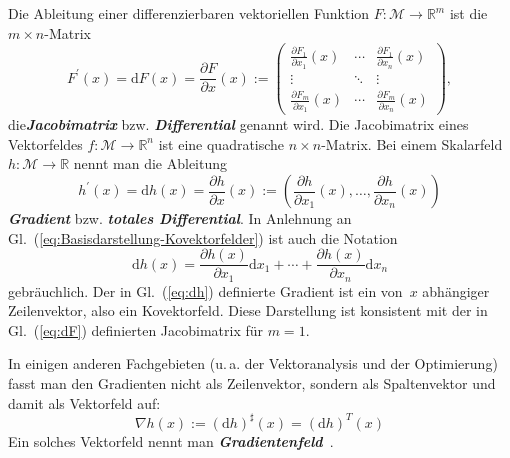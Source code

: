 Die Ableitung einer differenzierbaren vektoriellen
Funktion $F:\mathcal{M}\to{\mathbb{R}}^{m}$ ist die $m\times n$-Matrix
\begin{equation}
F^{\prime}(x)={\mathrm{d}} F(x)=\frac{\partial F}{\partial x}(x):=\left(\begin{array}{ccc}
\frac{\partial F_{1}}{\partial x_{1}}(x) & \cdots & \frac{\partial F_{1}}{\partial x_{n}}(x)\\
\vdots & \ddots & \vdots\\
\frac{\partial F_{m}}{\partial x_{1}}(x) & \cdots & \frac{\partial F_{m}}{\partial x_{n}}(x)
\end{array}\right),\label{eq:dF}
\end{equation}
die\textbf{\em  Jacobimatrix} bzw. \textbf{\em Differential}
genannt wird. Die Jacobimatrix eines Vektor\-feldes $f:\mathcal{M}\to{\mathbb{R}}^{n}$
ist eine quadratische $n\times n$-Matrix. Bei einem Skalarfeld $h:\mathcal{M}\to{\mathbb{R}}$
nennt man die Ableitung
\begin{equation}
h^{\prime}(x)={\mathrm{d}} h(x)=\frac{\partial h}{\partial x}(x):=\left(\frac{\partial h}{\partial x_{1}}(x),\ldots,\frac{\partial h}{\partial x_{n}}(x)\right)\label{eq:dh}
\end{equation}
\textbf{\em Gradient} bzw. \textbf{\em totales Differential}.
In Anlehnung an Gl.~(\ref{eq:Basisdarstellung-Kovektorfelder}) ist
auch die Notation
\[
{\mathrm{d}} h(x)=\frac{\partial h(x)}{\partial x_{1}}{\mathrm{d}} x_{1}+\cdots+\frac{\partial h(x)}{\partial x_{n}}{\mathrm{d}} x_{n}
\]
gebräuchlich. Der in Gl.~(\ref{eq:dh}) definierte Gradient ist ein
von~$x$ abhängiger Zeilenvektor, also ein Kovektorfeld. Diese Darstellung
ist konsistent mit der in Gl.~(\ref{eq:dF}) definierten Jacobimatrix
für $m=1$.
\begin{remark}
[Gradientenfeld]\label{rem:Gradient-als-Vektorfeld}In einigen anderen
Fachgebieten (u.\,a. der Vektoranalysis und der Optimierung) fasst
man den Gradienten nicht als Zeilenvektor, sondern als Spaltenvektor
und damit als Vektorfeld auf:
\[
\nabla h(x):=({\mathrm{d}} h)^{\sharp}(x)=({\mathrm{d}} h)^{T}(x)
\]
Ein solches Vektorfeld nennt man \textbf{\em Gradientenfeld}~\cite{koenigsberger2-2004,knauf2012}.
\end{remark}

